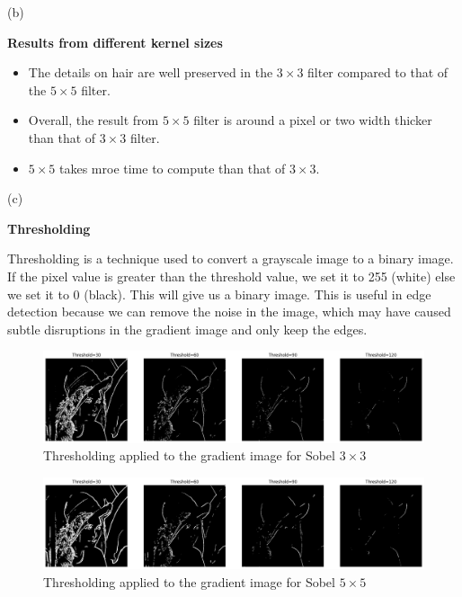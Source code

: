 {\large(b)}

\textbf{Results from different kernel sizes}

\begin{itemize}
    \item The details on hair are well preserved in the $3\times3$ filter compared to that of the $5\times5$ filter.
    \item Overall, the result from $5\times5$ filter is around a pixel or two width thicker than that of  $3\times3$ filter.
    \item $5\times5$ takes mroe time to compute than that of $3\times3$.
\end{itemize}


{\large(c)}

\textbf{Thresholding}

Thresholding is a technique used to convert a grayscale image to a binary image. If the pixel value is greater than the threshold value, we set it to 255 (white) else we set it to 0 (black). This will give us a binary image. This is useful in edge detection because we can remove the noise in the image, which may have caused subtle disruptions in the gradient image and only keep the edges.

\begin{figure}[H]
    \includegraphics[width=1.06\textwidth]{res/2c_3by3.png}
    \caption{Thresholding applied to the gradient image for Sobel $3\times3$}
    \label{fig:2c_3by3}
\end{figure}

\begin{figure}[H]
    \includegraphics[width=1.06\textwidth]{res/2c_5by5.png}
    \caption{Thresholding applied to the gradient image for Sobel $5\times5$}
    \label{fig:2c_5by5}
\end{figure}

